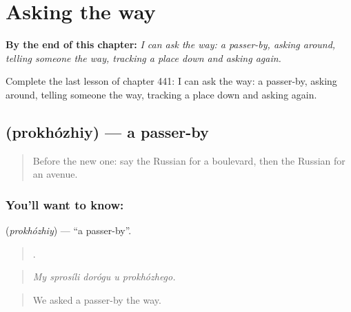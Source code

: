 
\chapter{Asking the way}
\label{ch:ru-asking-the-way}

\begin{chapteropening}
\textbf{By the end of this chapter:} \emph{I can ask the way: a passer-by, asking around, telling someone the way, tracking a place down and asking again.}

Complete the last lesson of chapter 441: I can ask the way: a passer-by, asking around, telling someone the way, tracking a place down and asking again.
\end{chapteropening}

\section[\texorpdfstring{\ru{прохожий} (prokhózhiy)}{прохожий (prokhózhiy)}]{ (prokhózhiy) — a passer-by}

\label{lesson:RU-C441-prokhozhiy}



\begin{quote}
Before the new one: say the Russian for a boulevard, then the Russian for an avenue.
\end{quote}

\subsection*{You'll want to know: }
\textbf{} (\emph{prokhózhiy}) — \textquotedblleft{}a passer-by\textquotedblright{}.

\begin{quote}
    .
\end{quote}

\begin{quote}
\emph{My sprosíli dorógu u prokhózhego.}
\end{quote}

\begin{quote}
We asked a passer-by the way.
\end{quote}

